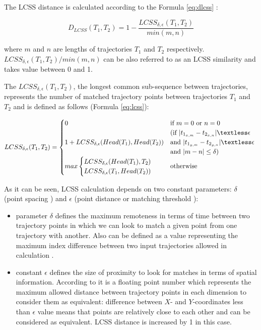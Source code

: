 The LCSS distance is calculated according to the Formula \ref{eq:dlcss} \cite{inproceedings:7_related_work}:

\begin{equation} \label{eq:dlcss}
	D_{LCSS}(T_1, T_2) = 1 - \frac {LCSS_{\delta, \epsilon}(T_1, T_2)} {min(m, n)}
\end{equation}

where $m$ and $n$ are lengths of trajectories $T_1$ and $T_2$ respectively. $LCSS_{\delta, \epsilon}(T_1, T_2) / min(m, n)$ can be also referred to as an LCSS similarity and takes value between 0 and 1. 

The $LCSS_{\delta, \epsilon}(T_1, T_2)$, the longest common sub-sequence between trajectories, represents the number of matched trajectory points between trajectories $T_1$ and $T_2$ and is defined as follows (Formula \ref{eq:lcss}):

\begin{equation} \label{eq:lcss}
	LCSS_{\delta, \epsilon}(T_1, T_2) = 
		\begin{cases}
			0 			&\text{if $m = 0$ or $n = 0$}\\
						&\text{(if $|t_{1_{x,m}} - t_{2_{x,n}}| \textless \epsilon$}\\
			1 + LCSS_{\delta, \epsilon}(Head(T_1), Head(T_2)) 
						&\text{and $|t_{1_{y,m}} - t_{2_{y,n}}| \textless \epsilon$ }\\
						&\text{and $|m - n| \le \delta$)}\\
			max
			\begin{cases}
				LCSS_{\delta, \epsilon}(Head(T_1), T_2)\\
				LCSS_{\delta, \epsilon}(T_1, Head(T_2))
			\end{cases} &\text{otherwise}
		\end{cases}
\end{equation}

As it can be seen, LCSS calculation depends on two constant parameters: $\delta$ (point spacing \cite{online:r_lcss}) and $\epsilon$ (point distance \cite{online:r_lcss} or matching threshold \cite{article:tr_sim_meas}): 
\begin{itemize}
	\item parameter $\delta$ defines the maximum remoteness in terms of time between two trajectory points in which we can look to match a given point from one trajectory with another. Also can be defined as a value representing the maximum index difference between two input trajectories allowed in calculation \cite{online:r_lcss}.
	\item constant $\epsilon$ defines the size of proximity to look for matches in terms of spatial information. According to \cite{online:r_lcss} it is a floating point number which represents the maximum allowed distance between trajectory points in each dimension to consider them as equivalent: difference between $X$- and $Y$-coordinates less than $\epsilon$ value means that points are relatively close to each other and can be considered as equivalent. LCSS distance is increased by 1 in this case.
\end{itemize}


